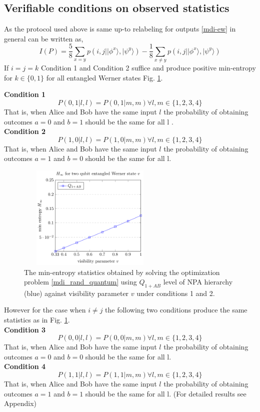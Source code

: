 \documentclass[doublecol,linenumbers]{epl2} %
\begin{document}
\subsection{Verifiable conditions on observed statistics}
As the protocol used above is same up-to relabeling for outputs \ref{mdi-ew} in general can be written as,
\begin{equation}\label{mdi-ew1}
I(P)=\frac{5}{8}\sum_{x= y}p(i,j||\phi^x\rangle,|\psi^y\rangle)-\frac{1}{8}\sum_{x\ne y}p(i,j||\phi^x\rangle,|\psi^y\rangle)
\end{equation}
If $i=j=k$ Condition 1 and Condition 2 suffice and produce positive min-entropy for $k\in\{0,1\}$ for all entangled Werner states Fig. \ref{plot1}.

\textbf{Condition 1}
\begin{equation}
P(0,1|l,l)=P(0,1|m,m)   \forall l,m\in \{1,2,3,4\} 
\end{equation}
That is, when Alice and Bob have the same input $l$ the probability of obtaining outcomes $a=0$ and $b=1$ should be the same for all l . \\
\textbf{Condition 2}
\begin{equation}
P(1,0|l,l)=P(1,0|m,m) \forall l,m\in \{1,2,3,4\} 
\end{equation}
That is, when Alice and Bob have the same input $l$ the probability of obtaining outcomes $a=1$ and $b=0$ should be the same for all l.\\
\begin{figure}[t]
\centering
\includegraphics[height=5cm,width=7cm]{plotMinE.pdf}
\caption{The min-entropy statistics obtained by solving the optimization problem \ref{mdi_rand_quantum} using $Q_{1+AB}$ level of NPA hierarchy (blue) against visibility parameter $v$ under conditions 1 and 2.}\label{plot1}
\end{figure}
However for the case when $i\neq j$ the following two conditions produce the same statistics as in Fig. \ref{plot1}.\\
\textbf{Condition 3}
\begin{equation}
P(0,0|l,l)=P(0,0|m,m) \forall l,m\in \{1,2,3,4\} 
\end{equation}
That is, when Alice and Bob have the same input $l$ the probability of obtaining outcomes $a=0$ and $b=0$ should be the same for all l. \\
\textbf{Condition 4}
\begin{equation}
P(1,1|l,l)=P(1,1|m,m) \forall l,m\in \{1,2,3,4\}
\end{equation}
That is, when Alice and Bob have the same input $l$ the probability of obtaining outcomes $a=1$ and $b=1$ should be the same for all l. (For detailed results see Appendix) \\
\end{document}
